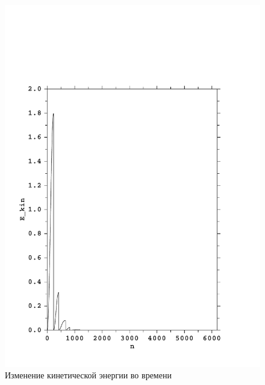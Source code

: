 \begin{figure}[h!]
\centering
  \includegraphics[width=1.0\textwidth]{./FIGs/Kin_energy_MD_norm.pdf}
\caption{Изменение кинетической энергии во времени}
\label{kinet_energy_MD_norm}
\end{figure}
